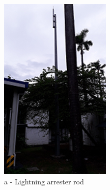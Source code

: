 \begin{figure}[!htb]
	\begin{minipage}[b]{0.3\linewidth}
		\centering
		\includegraphics[width=\textwidth]{figures/fig_ch04_elecaudit_visualinspection_lightarrester}
		\caption*{a - Lightning arrester rod}
	\end{minipage}
	\hspace{0.03cm}
	\begin{minipage}[b]{0.3\linewidth}
		\centering

\end{minipage}
\end{figure}
